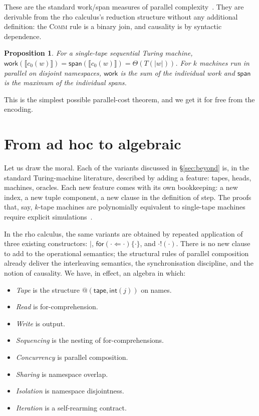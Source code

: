 \documentclass[11pt]{article}
\makeatletter
\theoremstyle{plain}
\newtheorem{proposition}[theorem]{Proposition}
\theoremstyle{definition}
\theoremstyle{remark}
\newcommand{\quo}[1]{@#1}
\newcommand{\snd}[2]{#1!(#2)}
\newcommand{\rcv}[3]{\mathsf{for}(#1 \Leftarrow #2)\{#3\}}
\newcommand{\sembrack}[1]{\llbracket #1 \rrbracket}
\newcommand{\sn}{\mathbin{\mid}}    %
\makeatother
\begin{document}
These are the standard work/span measures of parallel
complexity~\cite{BlellochGreiner96}. They are derivable from the rho
calculus's reduction structure without any additional definition: the
\textsc{Comm} rule is a binary join, and causality is by syntactic
dependence.

\begin{proposition}\label{prop:workspan}
For a single-tape sequential Turing machine, $\mathsf{work}(\sembrack{c_0(w)})
= \mathsf{span}(\sembrack{c_0(w)}) = \Theta(T(|w|))$. For $k$ machines run
in parallel on disjoint namespaces, $\mathsf{work}$ is the sum of the
individual work and $\mathsf{span}$ is the maximum of the individual spans.
\end{proposition}

\noindent This is the simplest possible parallel-cost theorem, and we get
it for free from the encoding.

\section{From ad hoc to algebraic}\label{sec:adhoc}

Let us draw the moral. Each of the variants discussed in
\S\ref{sec:beyond} is, in the standard Turing-machine literature,
described by adding a feature: tapes, heads, machines, oracles. Each new
feature comes with its own bookkeeping: a new index, a new tuple
component, a new clause in the definition of step. The proofs that, say,
$k$-tape machines are polynomially equivalent to single-tape machines
require explicit simulations~\cite{HopcroftUllman}.

In the rho calculus, the same variants are obtained by repeated
application of three existing constructors: $\sn$, $\rcv{\cdot}{\cdot}{\cdot}$,
and $\snd{\cdot}{\cdot}$. There is no new clause to add to the operational
semantics; the structural rules of parallel composition already deliver
the interleaving semantics, the synchronisation discipline, and the
notion of causality. We have, in effect, an algebra in which:

\begin{itemize}
\item \emph{Tape} is the structure $\quo{(\mathsf{tape}, \mathsf{int}(j))}$
on names.
\item \emph{Read} is for-comprehension.
\item \emph{Write} is output.
\item \emph{Sequencing} is the nesting of for-comprehensions.
\item \emph{Concurrency} is parallel composition.
\item \emph{Sharing} is namespace overlap.
\item \emph{Isolation} is namespace disjointness.
\item \emph{Iteration} is a self-rearming contract.
\end{itemize}
\end{document}
